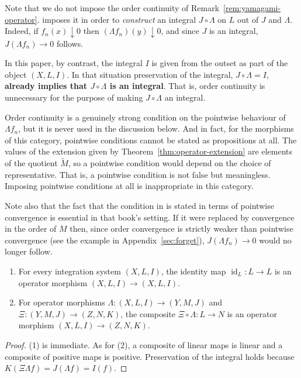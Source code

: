 \begin{remark}\label{rem:order-continuity-redundant}
  Note that we do not impose the order continuity of
  Remark~\ref{rem:yamagami-operator}.
  \cite{Yamagami} imposes it in order to \emph{construct} an integral
  $J\circ\Lambda$ on $L$ out of $J$ and $\Lambda$. Indeed, if
  $f_n(x)\downarrow0$ then $(\Lambda f_n)(y)\downarrow0$, and since $J$ is an
  integral, $J(\Lambda f_n)\to0$ follows.

  In this paper, by contrast, the integral $I$ is given from the outset as part
  of the object $(X,L,I)$.
  In that situation preservation of the integral, $J\circ\Lambda=I$,
  \textbf{already implies that $J\circ\Lambda$ is an integral}.
  That is, order continuity is unnecessary for the purpose of making
  $J\circ\Lambda$ an integral.

  Order continuity is a genuinely strong condition on the pointwise behaviour of
  $\Lambda f_n$, but it is never used in the discussion below.
  And in fact, for the morphisms of this category, pointwise conditions cannot
  be stated as propositions at all.
  The values of the extension given by
  Theorem~\ref{thm:operator-extension} are elements of the quotient
  $\widetilde{M}$, so a pointwise condition would depend on the choice of
  representative.
  That is, a pointwise condition is not false but meaningless.
  Imposing pointwise conditions at all is inappropriate in this category.

  Note also that the fact that the condition in \cite{Yamagami} is stated in
  terms of pointwise convergence is essential in that book's setting.
  If it were replaced by convergence in the order of $M$ then, since order
  convergence is strictly weaker than pointwise convergence (see the example in
  Appendix~\ref{sec:forget}), $J(\Lambda f_n)\to0$ would no longer follow.
\end{remark}

\begin{lemma}
  \begin{enumerate}
    \item For every integration system $(X,L,I)$, the identity map
      $\operatorname{id}_L:L\to L$ is an operator morphism
      $(X,L,I)\to(X,L,I)$.
    \item For operator morphisms $\Lambda:(X,L,I)\to(Y,M,J)$ and
      $\Xi:(Y,M,J)\to(Z,N,K)$, the composite $\Xi\circ\Lambda:L\to N$ is an
      operator morphism $(X,L,I)\to(Z,N,K)$.
  \end{enumerate}
\end{lemma}
\begin{proof}
  (1) is immediate. As for (2), a composite of linear maps is linear and a
  composite of positive maps is positive.
  Preservation of the integral holds because
  $K(\Xi\Lambda f)=J(\Lambda f)=I(f)$.
\end{proof}

